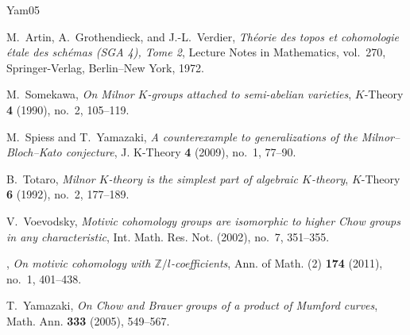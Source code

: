 \documentclass[a4paper,12pt]{amsart}
\numberwithin{equation}{section}
\theoremstyle{definition}
\begin{document}
\begin{thebibliography}{Yam05}


M.~Artin, A.~Grothendieck, and J.-L.~Verdier,
\emph{Th\'eorie des topos et cohomologie \'etale des sch\'emas
(SGA 4), Tome 2}, Lecture Notes in Mathematics, vol.~270,
Springer-Verlag, Berlin--New York, 1972.

M.~Somekawa, \emph{On {M}ilnor {$K$}-groups attached to semi-abelian
varieties}, $K$-Theory \textbf{4} (1990), no.~2, 105--119.

M.~Spiess and T.~Yamazaki, \emph{A counterexample to generalizations of
the {M}ilnor--{B}loch--{K}ato conjecture}, J. K-Theory \textbf{4} (2009),
no.~1, 77--90.

B.~Totaro, \emph{Milnor {$K$}-theory is the simplest part of algebraic
{$K$}-theory}, $K$-Theory \textbf{6} (1992), no.~2, 177--189.

V.~Voevodsky, \emph{Motivic cohomology groups are isomorphic to higher
{C}how groups in any characteristic}, Int. Math. Res. Not. (2002), no.~7,
351--355.

\bysame, \emph{On motivic cohomology with
{$\mathbb Z/l$}-coefficients}, Ann. of Math. (2) \textbf{174} (2011), no.~1,
401--438.

T.~Yamazaki, \emph{On {C}how and {B}rauer groups of a product of {M}umford
curves}, Math. Ann. \textbf{333} (2005), 549--567.

\end{thebibliography}
\end{document}
